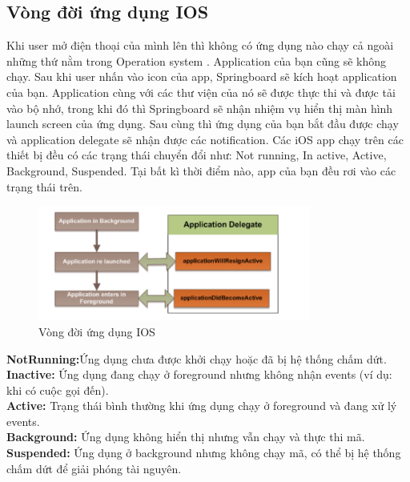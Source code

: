    \subsection{ Vòng đời ứng dụng IOS}	
        \begin{flushleft}
            Khi user mở điện thoại của mình lên thì không có ứng dụng nào chạy cả ngoài những thứ nằm trong Operation system . Application của bạn cũng sẽ không chạy. Sau khi user nhấn vào icon của app, Springboard sẽ kích hoạt application của bạn. Application cùng với các thư viện của nó sẽ được thực thi và được tải vào bộ nhớ, trong khi đó thì Springboard sẽ nhận nhiệm vụ hiển thị màn hình launch screen của ứng dụng. Sau cùng thì ứng dụng của bạn bắt đầu được chạy và application delegate sẽ nhận được các notification.
Các iOS app chạy trên các thiết bị đều có các trạng thái chuyển đổi như: Not running, In active, Active, Background, Suspended. Tại bất kì thời điểm nào, app của bạn đều rơi vào các trạng thái trên.
        \end{flushleft}
        \begin{figure}[H] %
            \centering
            \includegraphics[width=0.8\textwidth]{images/vongdoiios.png}
             \caption{Vòng đời ứng dụng IOS}
            \label{fig:vongdoiios}
        \end{figure}
         \begin{flushleft}
            \textbf{NotRunning:}Ứng dụng chưa được khởi chạy hoặc đã bị hệ thống chấm dứt.
            \textbf{Inactive:} Ứng dụng đang chạy ở foreground nhưng không nhận events (ví dụ: khi có cuộc gọi đến).\\
            \textbf{Active:} Trạng thái bình thường khi ứng dụng chạy ở foreground và đang xử lý events.\\
            \textbf{Background:} Ứng dụng không hiển thị nhưng vẫn chạy và thực thi mã.\\
            \textbf{Suspended:} Ứng dụng ở background nhưng không chạy mã, có thể bị hệ thống chấm dứt để giải phóng tài nguyên.
         \end{flushleft}
